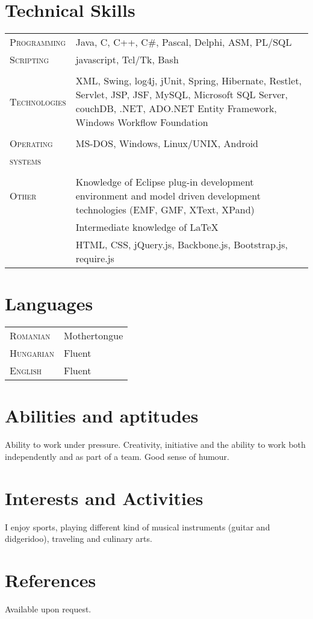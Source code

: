 \documentclass[a4paper,10pt]{article}
\begin{document}
\section{Technical Skills}
\begin{tabular}{p{2.5cm}p{11cm}}
\textsc{Programming} & Java, C, C++, C\#, Pascal, Delphi, ASM, PL/SQL\\
\textsc{Scripting} & javascript, Tcl/Tk, Bash\\ 
\multicolumn{2}{c}{} \\ 
\textsc{Technologies} & XML, Swing, log4j, jUnit, Spring, Hibernate, Restlet, Servlet, JSP, JSF, MySQL, Microsoft SQL Server, couchDB, .NET, ADO.NET Entity Framework, Windows Workflow Foundation\\ 
 \multicolumn{2}{c}{} \\
 \textsc{Operating} & MS-DOS, Windows, Linux/UNIX, Android\\
 \textsc{systems}&\\ 
 \multicolumn{2}{c}{} \\
 \textsc{Other} & Knowledge of Eclipse plug-in development environment and model
 driven development technologies (EMF, GMF, XText, XPand)\\
 & Intermediate knowledge of \LaTeX \\
 & HTML, CSS, jQuery.js, Backbone.js, Bootstrap.js, require.js\\
\end{tabular}

\section{Languages}
\begin{tabular}{p{2.5cm}p{11cm}}
\textsc{Romanian}& Mothertongue\\
\textsc{Hungarian}& Fluent\\
\textsc{English}& Fluent\\
\end{tabular}

\section{Abilities and aptitudes}
Ability to work under pressure.
Creativity, initiative and the ability to work both independently and as part of
a team. Good sense of humour.

\section{Interests and Activities}
I enjoy sports, playing different kind of musical instruments (guitar and
didgeridoo), traveling and culinary arts.

\section{References}
Available upon request.


\end{document}
